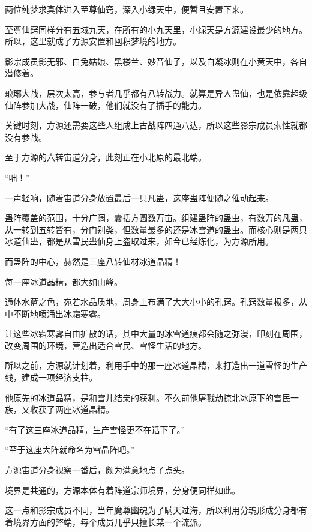 
\begin{this_body}



两位纯梦求真体进入至尊仙窍，深入小绿天中，便暂且安置下来。

至尊仙窍同样分有五域九天，在所有的小九天里，小绿天是方源建设最少的地方。所以，这里就成了方源安置和囤积梦境的地方。

影宗成员影无邪、白兔姑娘、黑楼兰、妙音仙子，以及白凝冰则在小黄天中，各自潜修着。

琅琊大战，层次太高，参与者几乎都有八转战力。就算是异人蛊仙，也是依靠超级仙阵参加大战，仙阵一破，他们就没有了插手的能力。

关键时刻，方源还需要这些人组成上古战阵四通八达，所以这些影宗成员索性就都没有参战。

至于方源的六转宙道分身，此刻正在小北原的最北端。

“咄！”

一声轻响，随着宙道分身放置最后一只凡蛊，这座蛊阵便随之催动起来。

蛊阵覆盖的范围，十分广阔，囊括方圆数万亩。组建蛊阵的蛊虫，有数万的凡蛊，从一转到五转皆有，分门别类，但数量最多的还是冰雪道的蛊虫。而核心则是两只冰道仙蛊，都是从雪民蛊仙身上盗取过来，如今已经炼化，为方源所用。

而蛊阵的中心，赫然是三座八转仙材冰道晶精！

每一座冰道晶精，都大如山峰。

通体水蓝之色，宛若水晶质地，周身上布满了大大小小的孔窍。孔窍数量极多，从中不断地喷涌出冰霜寒雾。

让这些冰霜寒雾自由扩散的话，其中大量的冰雪道痕都会随之弥漫，印刻在周围，改变周围的环境，营造出适合雪民、雪怪生活的地方。

所以之前，方源就计划着，利用手中的那一座冰道晶精，来打造出一道雪怪的生产线，建成一项经济支柱。

他原先的冰道晶精，是和雪儿结亲的获利。不久前他屠戮劫掠北冰原下的雪民一族，又收获了两座冰道晶精。

“有了这三座冰道晶精，生产雪怪更不在话下了。”

“至于这座大阵就命名为雪晶阵吧。”

方源宙道分身视察一番后，颇为满意地点了点头。

境界是共通的，方源本体有着阵道宗师境界，分身便同样如此。

这一点和影宗成员不同，当年魔尊幽魂为了瞒天过海，所以利用分魂形成分身都有着境界方面的弊端，每个成员几乎只擅长某一个流派。


\end{this_body}
